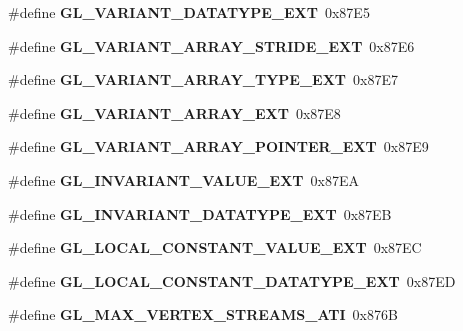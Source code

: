 \begin{DoxyCompactItemize}
\item 
\#define {\bfseries G\+L\+\_\+\+V\+A\+R\+I\+A\+N\+T\+\_\+\+D\+A\+T\+A\+T\+Y\+P\+E\+\_\+\+E\+X\+T}~0x87\+E5\label{_s_d_l__opengl_8h_a769c6fa1de10e2a6f3149fd8c7620157}

\item 
\#define {\bfseries G\+L\+\_\+\+V\+A\+R\+I\+A\+N\+T\+\_\+\+A\+R\+R\+A\+Y\+\_\+\+S\+T\+R\+I\+D\+E\+\_\+\+E\+X\+T}~0x87\+E6\label{_s_d_l__opengl_8h_aec75c3d351fe183d56e80da493977685}

\item 
\#define {\bfseries G\+L\+\_\+\+V\+A\+R\+I\+A\+N\+T\+\_\+\+A\+R\+R\+A\+Y\+\_\+\+T\+Y\+P\+E\+\_\+\+E\+X\+T}~0x87\+E7\label{_s_d_l__opengl_8h_a3ed967437e493e21f096c2922d2da473}

\item 
\#define {\bfseries G\+L\+\_\+\+V\+A\+R\+I\+A\+N\+T\+\_\+\+A\+R\+R\+A\+Y\+\_\+\+E\+X\+T}~0x87\+E8\label{_s_d_l__opengl_8h_ad1c0f6a92f4c53510f3ab80ea091742c}

\item 
\#define {\bfseries G\+L\+\_\+\+V\+A\+R\+I\+A\+N\+T\+\_\+\+A\+R\+R\+A\+Y\+\_\+\+P\+O\+I\+N\+T\+E\+R\+\_\+\+E\+X\+T}~0x87\+E9\label{_s_d_l__opengl_8h_ad2dfa96531015f1908bc7e7c92c0667d}

\item 
\#define {\bfseries G\+L\+\_\+\+I\+N\+V\+A\+R\+I\+A\+N\+T\+\_\+\+V\+A\+L\+U\+E\+\_\+\+E\+X\+T}~0x87\+E\+A\label{_s_d_l__opengl_8h_adb0a6490632b7c971c2fa0b9e61b2274}

\item 
\#define {\bfseries G\+L\+\_\+\+I\+N\+V\+A\+R\+I\+A\+N\+T\+\_\+\+D\+A\+T\+A\+T\+Y\+P\+E\+\_\+\+E\+X\+T}~0x87\+E\+B\label{_s_d_l__opengl_8h_a8938367b0d8dbd1a28e7c25069fdf836}

\item 
\#define {\bfseries G\+L\+\_\+\+L\+O\+C\+A\+L\+\_\+\+C\+O\+N\+S\+T\+A\+N\+T\+\_\+\+V\+A\+L\+U\+E\+\_\+\+E\+X\+T}~0x87\+E\+C\label{_s_d_l__opengl_8h_ae4401b9f6cc1a271ca434820fb82d22f}

\item 
\#define {\bfseries G\+L\+\_\+\+L\+O\+C\+A\+L\+\_\+\+C\+O\+N\+S\+T\+A\+N\+T\+\_\+\+D\+A\+T\+A\+T\+Y\+P\+E\+\_\+\+E\+X\+T}~0x87\+E\+D\label{_s_d_l__opengl_8h_afed08673d93faa2c2a2b118a99662d20}

\item 
\#define {\bfseries G\+L\+\_\+\+M\+A\+X\+\_\+\+V\+E\+R\+T\+E\+X\+\_\+\+S\+T\+R\+E\+A\+M\+S\+\_\+\+A\+T\+I}~0x876\+B\label{_s_d_l__opengl_8h_a82b5be21bf0a47696df7994fe1528ac2}


\end{DoxyCompactItemize}
